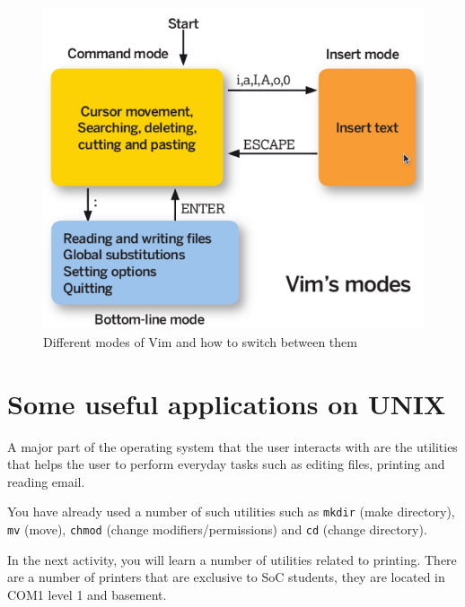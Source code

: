 \begin{frame}
\begin{figure}
\begin{center}
\includegraphics[scale=0.4]{vim_modes}
\end{center}
\caption{Different modes of Vim and how to switch between them}
\label{fig:vim_modes}
\end{figure}
\end{frame}


\section{Some useful applications on UNIX}
A major part of the operating system that the user interacts with are the
utilities that helps the user to perform everyday tasks such as editing files,
printing and reading email.     

You have already used a number of such utilities such as \texttt{mkdir} (make
directory), \texttt{mv} (move), \texttt{chmod} (change modifiers/permissions)
and \texttt{cd} (change directory).

In the next activity, you will learn a number of utilities related to printing.
There are a number of printers that are exclusive to SoC students, they are
located in COM1 level 1 and basement.  

